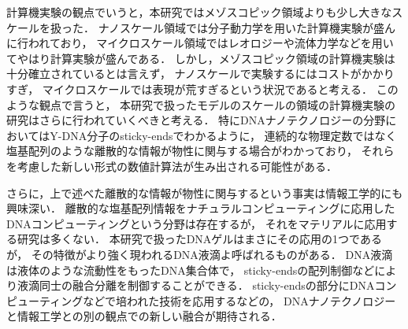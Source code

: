 計算機実験の観点でいうと，本研究ではメゾスコピック領域よりも少し大きなスケールを扱った．
ナノスケール領域では分子動力学を用いた計算機実験が盛んに行われており，
マイクロスケール領域ではレオロジーや流体力学などを用いてやはり計算実験が盛んである．
しかし，メゾスコピック領域の計算機実験は十分確立されているとは言えず，
ナノスケールで実験するにはコストがかかりすぎ，
マイクロスケールでは表現が荒すぎるという状況であると考える．
このような観点で言うと，
本研究で扱ったモデルのスケールの領域の計算機実験の研究はさらに行われていくべきと考える．
特にDNAナノテクノロジーの分野においてはY-DNA分子のsticky-endsでわかるように，
連続的な物理定数ではなく塩基配列のような離散的な情報が物性に関与する場合がわかっており，
それらを考慮した新しい形式の数値計算法が生み出される可能性がある．

さらに，上で述べた離散的な情報が物性に関与するという事実は情報工学的にも興味深い．
離散的な塩基配列情報をナチュラルコンピューティングに応用したDNAコンピューティングという分野は存在するが，
それをマテリアルに応用する研究は多くない．
本研究で扱ったDNAゲルはまさにその応用の1つであるが，
その特徴がより強く現われるDNA液滴よ呼ばれるものがある\cite{sato2019sequence}．
DNA液滴は液体のような流動性をもったDNA集合体で，
sticky-endsの配列制御などにより液滴同士の融合分離を制御することができる．
sticky-endsの部分にDNAコンピューティングなどで培われた技術を応用するなどの，
DNAナノテクノロジーと情報工学との別の観点での新しい融合が期待される．
